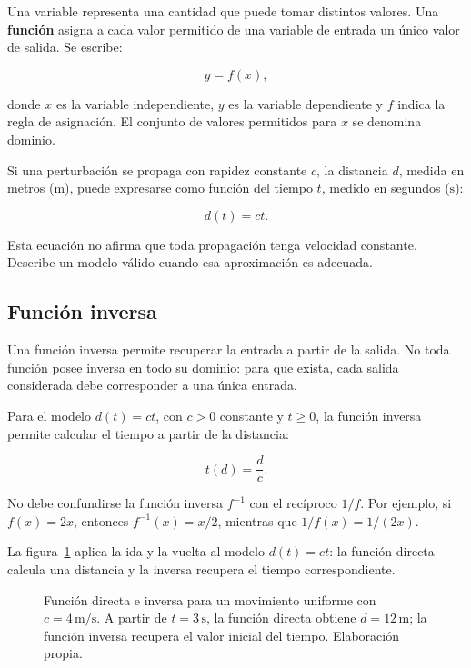 Una variable representa una cantidad que puede tomar distintos valores. Una \textbf{función} asigna a cada valor permitido de una variable de entrada un único valor de salida. Se escribe:

\[
    y=f(x),
\]

donde \(x\) es la variable independiente, \(y\) es la variable dependiente y \(f\) indica la regla de asignación. El conjunto de valores permitidos para \(x\) se denomina dominio.

Si una perturbación se propaga con rapidez constante \(c\), la distancia \(d\), medida en metros (\(\text{m}\)), puede expresarse como función del tiempo \(t\), medido en segundos (\(\text{s}\)):

\[
    d(t)=ct.
\]

Esta ecuación no afirma que toda propagación tenga velocidad constante. Describe un modelo válido cuando esa aproximación es adecuada.

\subsection{Función inversa}
\label{sec:u1-funcion-inversa}

Una función inversa permite recuperar la entrada a partir de la salida. No toda función posee inversa en todo su dominio: para que exista, cada salida considerada debe corresponder a una única entrada.

Para el modelo \(d(t)=ct\), con \(c>0\) constante y \(t\geq0\), la función inversa permite calcular el tiempo a partir de la distancia:

\[
    t(d)=\frac{d}{c}.
\]

No debe confundirse la función inversa \(f^{-1}\) con el recíproco \(1/f\). Por ejemplo, si \(f(x)=2x\), entonces \(f^{-1}(x)=x/2\), mientras que \(1/f(x)=1/(2x)\).

La figura~\ref{fig:funcion-directa-inversa} aplica la ida y la vuelta al modelo \(d(t)=ct\): la función directa calcula una distancia y la inversa recupera el tiempo correspondiente.

\begin{figure}[htbp]
    \centering
    
    \caption{Función directa e inversa para un movimiento uniforme con \(c=4\,\text{m}/\text{s}\). A partir de \(t=3\,\text{s}\), la función directa obtiene \(d=12\,\text{m}\); la función inversa recupera el valor inicial del tiempo. Elaboración propia.}
    \label{fig:funcion-directa-inversa}
\end{figure}

